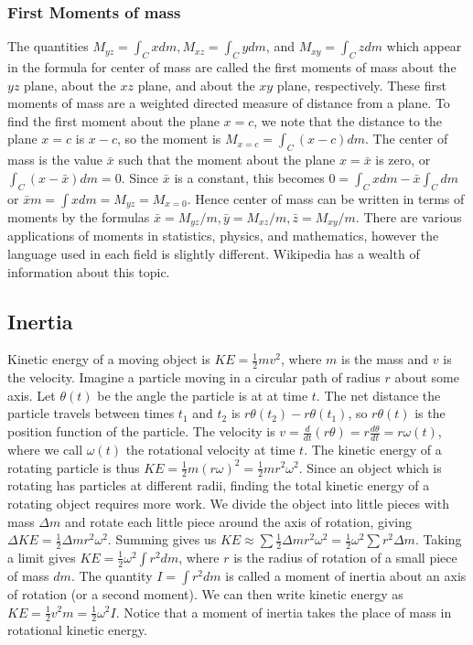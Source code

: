 \subsubsection{First Moments of mass}
The quantities $M_{yz}=\int_C x dm, M_{xz}=\int_C y dm$, and  $M_{xy}=\int_C z
dm$ which appear in the formula for center of mass are called the
first moments of mass about the $yz$ plane, about the $xz$ plane, and
about the $xy$ plane, respectively. These first moments of mass are a
weighted directed measure of distance from a plane. 
To find the first moment about the plane $x=c$, we note that the
distance to the plane $x=c$ is $x-c$, so the moment is $M_{x=c}=\int_C
(x-c)dm$.  The center of mass is the value $\bar x$ such that the
moment about the plane $x=\bar x$ is zero, or $\int_C(x-\bar x)dm = 0$.
Since $\bar x$ is a constant, this becomes $0=\int_C x dm - \bar x \int_C dm$
or $\bar x m = \int x dm=M_{yz}=M_{x=0}$. Hence center of mass can be
written in terms of moments by the formulas
$\bar x =M_{yz}/m,\bar y =M_{xz}/m, \bar z = M_{xy}/m$. 
There are various applications of moments in statistics, physics, and
mathematics, however the language used in each field is slightly
different. Wikipedia has a wealth of information about this topic.

\subsection{Inertia}
%
Kinetic energy of a moving object is $\displaystyle KE=\frac{1}{2}
mv^2$, where $m$ is the mass and $v$ is the velocity. Imagine a
particle moving in a circular path of radius $r$ about some axis.  Let
$\theta(t)$ be the angle the particle is at at time $t$.  The net distance
the particle travels between times $t_1$ and $t_2$ is
$r\theta(t_2)-r\theta(t_1)$, so $r\theta(t)$ is the position function of the
particle.  The velocity is {$ v=\frac{d}{dt}(r\theta)=r\frac{d\theta}{dt} =
  r\omega(t) $}, where we call $\omega(t)$ the rotational velocity at time
$t$. The kinetic energy of a rotating particle is thus {$\displaystyle
  KE=\frac{1}{2} m(r\omega)^2 = \frac{1}{2} m r^2\omega^2$}. Since an object
which is rotating has particles at different radii, finding the total
kinetic energy of a rotating object requires more work.  We divide the
object into little pieces with mass {$\Delta m$} and rotate each little
piece around the axis of rotation, giving {$\displaystyle \Delta KE=
  \frac{1}{2} \Delta m r^2 \omega^2$}.  Summing gives us {$\displaystyle KE \approx \sum
  \frac{1}{2} \Delta m r^2 \omega^2 = \frac{1}{2} \omega^2 \sum r^2 \Delta m$}. Taking a
limit gives {$\displaystyle KE = \frac{1}{2} \omega^2 \int r^2 dm$}, where
{$r$} is the radius of rotation of a small piece of mass $dm$.  The
quantity {$I=\int r^2 dm$} is called a moment of inertia about an axis of
rotation (or a second moment). We can then write kinetic energy as
$KE=\frac{1}{2}v^2 m = \frac{1}{2}\omega^2 I$. Notice that a moment of
inertia takes the place of mass in rotational kinetic energy.

